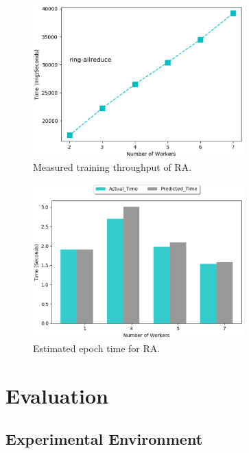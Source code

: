 \documentclass[conference]{IEEEtran}
\begin{document}
\begin{figure}[htb]
  \includegraphics[width=3.2in]{Fig/mpithroughput}
  \caption{Measured training throughput of RA.}
  \label{fig:mpithroughput}
\end{figure}

\begin{figure}[htb]
  \includegraphics[width=3.2in]{Fig/mpimodel}
  \caption{Estimated epoch time for RA.}
  \label{fig:mpimodel}
\end{figure}

\section{Evaluation}
\label{sec:eval}
\subsection{Experimental Environment}
\end{document}

